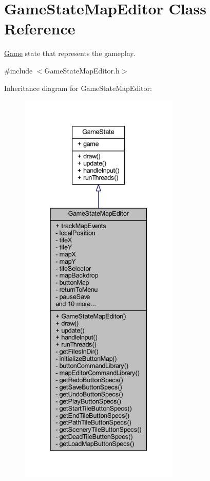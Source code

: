 \hypertarget{class_game_state_map_editor}{\section{Game\+State\+Map\+Editor Class Reference}
\label{class_game_state_map_editor}
}


\hyperlink{class_game}{Game} state that represents the gameplay.  




{\ttfamily \#include $<$Game\+State\+Map\+Editor.\+h$>$}



Inheritance diagram for Game\+State\+Map\+Editor\+:\nopagebreak
\begin{figure}[H]
\begin{center}
\leavevmode
\includegraphics[height=550pt]{class_game_state_map_editor__inherit__graph}
\end{center}
\end{figure}


